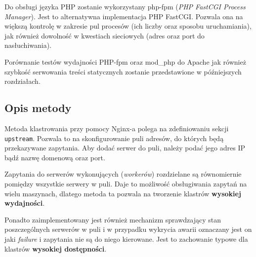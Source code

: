 {Do obsługi języka PHP zostanie wykorzystany php-fpm (\textit{PHP FastCGI Process Manager}).
Jest to alternatywna implementacja PHP FastCGI.
Pozwala ona na większą kontrolę w zakresie pul procesów (ich liczby oraz sposobu uruchamiania), jak również dowolność w kwestiach sieciowych (adres oraz port do nasłuchiwania).

Porównanie testów wydajności PHP-fpm oraz mod\_php do Apache jak również szybkość serwowania treści statycznych zostanie przedstawione w późniejszych rozdziałach.
\subsection{Opis metody}
Metoda klastrowania przy pomocy Nginx-a polega na zdefiniowaniu sekcji \texttt{upstream}.
Pozwala to na skonfigurowanie puli adresów, do których będą przekazywane zapytania.
Aby dodać serwer do puli, należy podać jego adres IP bądź nazwę domenową oraz port.

Zapytania do serwerów wykonujących (\textit{workerów}) rozdzielane są równomiernie pomiędzy wszystkie serwery w puli.
Daje to możliwość obsługiwania zapytań na wielu maszynach, dlatego metoda ta pozwala na tworzenie klastrów \textbf{wysokiej wydajności}.

Ponadto zaimplementowany jest również mechanizm sprawdzający stan poszczególnych serwerów w puli i w przypadku wykrycia awarii oznaczany jest on jaki \textit{failure} i zapytania nie są do niego kierowane.
Jest to zachowanie typowe dla klastrów \textbf{wysokiej dostępności}.

}
